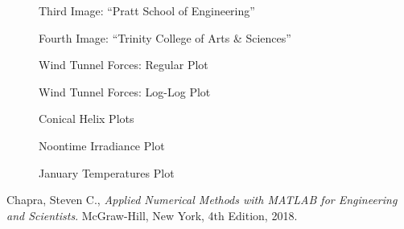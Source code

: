 \documentclass{article}
\begin{document}
\begin{figure}[ht!]
\begin{center}
\caption{Third Image: ``Pratt School of Engineering''}
\end{center}
\end{figure}

\begin{figure}[ht!]
\begin{center}
\caption{Fourth Image: ``Trinity College of Arts \& Sciences''}
\end{center}
\end{figure}

\clearpage

\begin{figure}[ht!]
\begin{center}
\caption{Wind Tunnel Forces: Regular Plot}
\end{center}
\end{figure}

\begin{figure}[ht!]
\begin{center}
\caption{Wind Tunnel Forces: Log-Log Plot}
\end{center}
\end{figure}

\begin{figure}[ht!]
\begin{center}
\caption{Conical Helix Plots}
\end{center}
\end{figure}
\clearpage

\begin{figure}[ht!]
\begin{center}
\caption{Noontime Irradiance Plot}
\end{center}
\end{figure}

\begin{figure}[ht!]
\begin{center}
\caption{January Temperatures Plot}
\end{center}
\end{figure}
\clearpage

\begin{thebibliography}{9}
  Chapra, Steven C.,
  {\it Applied Numerical Methods with MATLAB for Engineering and Scientists}.
  McGraw-Hill, New York,
  4th Edition,
  2018.
\end{thebibliography}
\end{document}
